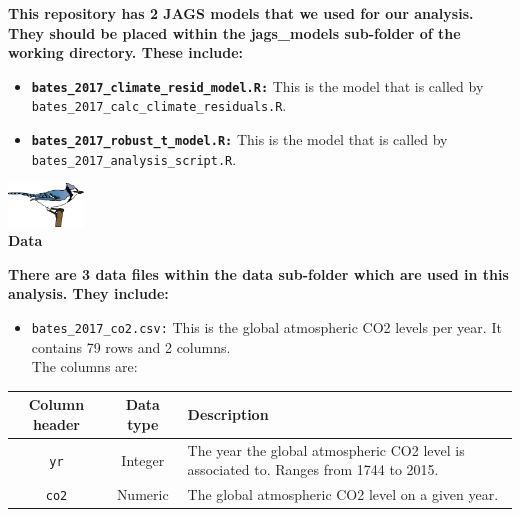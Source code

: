 \documentclass[10pt,a4paper]{article}
\begin{document}
\textbf{This repository has 2 JAGS models that we used for our analysis. They should be placed within the jags\_models sub-folder of the working directory. These include:}\\

\begin{itemize}
\item \texttt{\textbf{bates\_2017\_climate\_resid\_model.R:}} This is the model that is called by \texttt{bates\_2017\_calc\_climate\_residuals.R}.
\item \texttt{\textbf{bates\_2017\_robust\_t\_model.R:}} This is the model that is called by \texttt{bates\_2017\_analysis\_script.R}. 
\end{itemize}

\noindent\makebox[\linewidth]{\rule{\paperwidth}{0.4pt}}

\begin{center}
\includegraphics[width=0.15\textwidth]{blue_jay.png}\\
\vspace{2mm}
\textbf{\Large Data}
\end{center}
\noindent\makebox[\linewidth]{\rule{\paperwidth}{0.4pt}}

\textbf{There are 3 data files within the data sub-folder which are used in this analysis. They include:}
\vspace{1.5mm}

\begin{itemize}
\item \texttt{bates\_2017\_co2.csv:} This is the global atmospheric CO2 levels per year. It contains 79 rows and 2 columns. \\The columns are:\\
\end{itemize}

\begin{center}
    \begin{tabular}{ | c | c | p{12cm} |}
    \hline
    Column header & Data type & Description\\
    \hline
     \texttt{yr}& Integer & The year the global atmospheric CO2 level is associated to. Ranges from 1744 to 2015. \\
     \hline
     \texttt{co2} & Numeric & The global atmospheric CO2 level on a given year.\\
    \hline
    \end{tabular}
\end{center}
\end{document}
